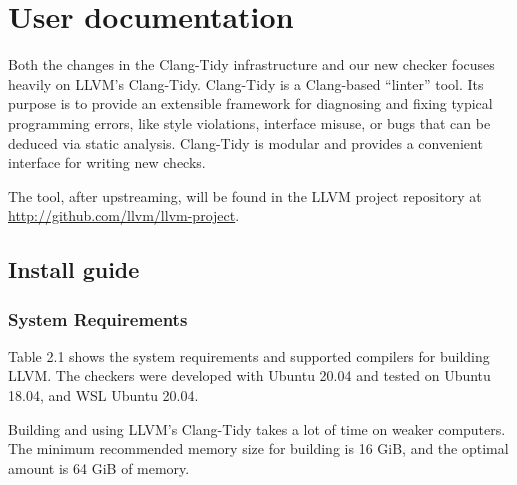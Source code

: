 
\chapter{User documentation}
\label{ch:user}

Both the changes in the Clang-Tidy infrastructure and our new checker focuses heavily on LLVM's Clang-Tidy.
Clang-Tidy is a Clang-based \CC{} ``linter'' tool. Its purpose is to provide an extensible framework for diagnosing and fixing
typical programming errors, like style violations, interface misuse, or bugs that can be deduced via static analysis.
Clang-Tidy is modular and provides a convenient interface for writing new checks. %

The tool, after upstreaming, will be found in the LLVM project repository at \url{http://github.com/llvm/llvm-project}.

\section{Install guide}

\subsection{System Requirements}

Table 2.1 shows the system requirements and supported compilers for building
LLVM. The checkers were developed with Ubuntu 20.04 and tested on Ubuntu 18.04, and WSL Ubuntu 20.04.

Building and using LLVM's Clang-Tidy takes a lot of time on weaker computers. The minimum recommended memory size
for building is 16 GiB, and the optimal amount is 64 GiB of memory. %

